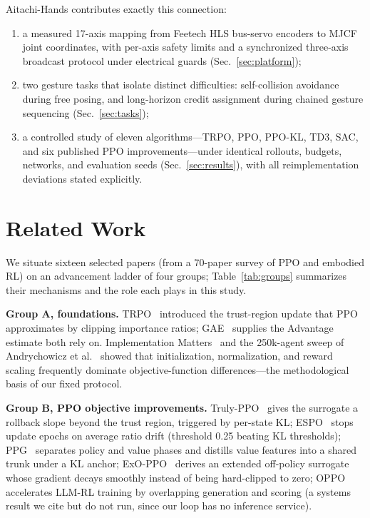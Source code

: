 \documentclass[conference]{IEEEtran}
\begin{document}
Aitachi-Hands contributes exactly this connection:
\begin{enumerate}
\item a measured 17-axis mapping from Feetech HLS bus-servo encoders to
MJCF joint coordinates, with per-axis safety limits and a synchronized
three-axis broadcast protocol under electrical guards
(Sec.~\ref{sec:platform});
\item two gesture tasks that isolate distinct difficulties: self-collision
avoidance during free posing, and long-horizon credit assignment during
chained gesture sequencing (Sec.~\ref{sec:tasks});
\item a controlled study of eleven algorithms---TRPO, PPO, PPO-KL, TD3,
SAC, and six published PPO improvements---under identical rollouts, budgets,
networks, and evaluation seeds (Sec.~\ref{sec:results}), with all
reimplementation deviations stated explicitly.
\end{enumerate}

\section{Related Work}\label{sec:related}
We situate sixteen selected papers (from a 70-paper survey of PPO and embodied
RL) on an advancement ladder of four groups; Table~\ref{tab:groups}
summarizes their mechanisms and the role each plays in this study.

\textbf{Group A, foundations.} TRPO~\cite{trpo} introduced the
trust-region update that PPO~\cite{ppo} approximates by clipping importance
ratios; GAE~\cite{gae} supplies the Advantage estimate both rely on.
Implementation Matters~\cite{impl} and the 250k-agent sweep of
Andrychowicz et al.~\cite{opac} showed that initialization, normalization,
and reward scaling frequently dominate objective-function differences---the
methodological basis of our fixed protocol.

\textbf{Group B, PPO objective improvements.} Truly-PPO~\cite{trulyp} gives
the surrogate a rollback slope beyond the trust region, triggered by
per-state KL; ESPO~\cite{espo} stops update epochs on average ratio drift
(threshold 0.25 beating KL thresholds); PPG~\cite{ppg} separates policy and
value phases and distills value features into a shared trunk under a KL
anchor; ExO-PPO~\cite{exo} derives an extended off-policy surrogate whose
gradient decays smoothly instead of being hard-clipped to zero; OPPO~\cite{oppo}
accelerates LLM-RL training by overlapping generation and scoring (a systems
result we cite but do not run, since our loop has no inference service).
\end{document}
